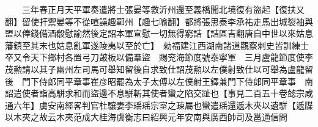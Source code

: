 　　三年春正月天平軍奏遣將士張晏等救沂州還至義橋聞北境復有盜起【復扶又翻】留使扞禦晏等不從喧譟趣鄆州【趣七喻翻】都將張思泰李承祐走馬出城裂袖與盟以俸錢備酒殽慰諭然後定詔本軍宣慰一切無得窮詰【詰區吉翻唐自中世以來姑息藩鎮至其末也姑息亂軍遂陵夷以至於亡】　勑福建江西湖南諸道觀察刺史皆訓練士卒又令天下鄉村各置弓刀皷板以備羣盜　賜兖海節度號泰寧軍　三月盧龍節度使李茂勲請以其子幽州左司馬可舉知留後自求致仕詔茂勲以左僕射致仕以可舉為盧龍留後　門下侍郎同平章事崔彦昭罷為太子太傅以左僕射王鐸兼門下侍郎同平章事　南詔遣使者詣高駢求和而盜邊不息駢斬其使者蠻之陷交趾也【事見二百五十卷懿宗咸通六年】虜安南經畧判官杜驤妻李瑶瑶宗室之疎屬也蠻遣瑶還遞木夾以遺駢【遞牒以木夾之故云木夾范成大桂海虞衡志曰紹興元年安南與廣西帥司及邕通信問